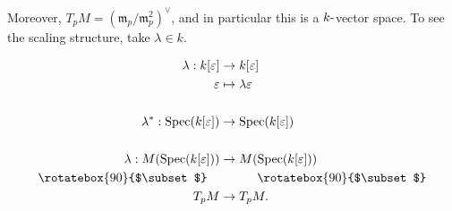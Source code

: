 \begin{center}
\end{center}

Moreover, \(T_p M = ({\mathfrak{m}}_p / {\mathfrak{m}}_p^2)^\vee\), and
in particular this is a \(k{\hbox{-}}\)vector space. To see the scaling
structure, take \(\lambda \in k\).

\begin{align*} \lambda: k[\varepsilon] & \to k[\varepsilon] \\ \varepsilon &\mapsto \lambda \varepsilon \\ \\ \lambda^*: \operatorname{Spec}(k[\varepsilon]) &\to \operatorname{Spec}(k[\varepsilon]) \\ \\ \lambda: M(\operatorname{Spec}(k[\varepsilon])) &\to M(\operatorname{Spec}(k[\varepsilon])) \\ \rotatebox{90}{$\subset$} \quad & \quad\quad\quad \rotatebox{90}{$\subset$}  \\ T_pM &\to T_pM  .\end{align*}

